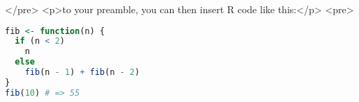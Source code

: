\usepackage{listings}
</pre>
<p>to your preamble, you can then insert R code like this:</p>
<pre>
\begin{lstlisting}[language=R]
fib <- function(n) {
  if (n < 2)
    n
  else
    fib(n - 1) + fib(n - 2)
}
fib(10) # => 55
\end{lstlisting}
